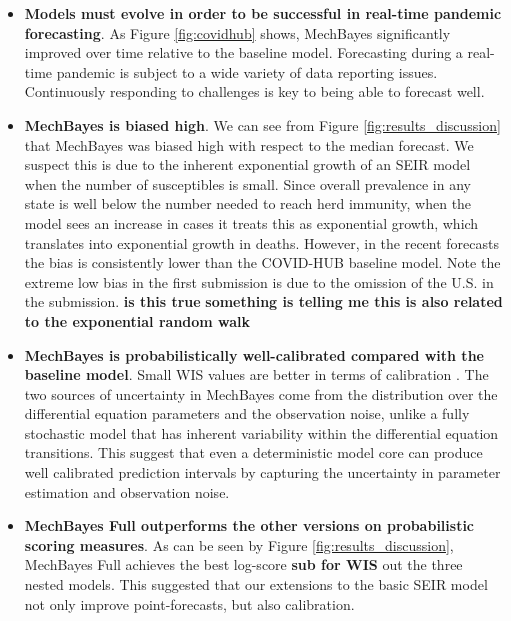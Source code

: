 \documentclass[11pt]{amsart}
\begin{document}
\begin{itemize}
\item \textbf{Models must evolve in order to be successful in real-time pandemic forecasting}. As Figure \ref{fig:covidhub} shows, MechBayes significantly improved over time relative to the baseline model. Forecasting during a real-time pandemic is subject to a wide variety of data reporting issues. Continuously responding to challenges is key to being able to forecast well. 

\item \textbf{MechBayes is biased high}. We can see from Figure \ref{fig:results_discussion} that MechBayes was biased high with respect to the median forecast. We suspect this is due to the inherent exponential growth of an SEIR model when the number of susceptibles is small. Since overall prevalence in any state is well below the number needed to reach herd immunity, when the model sees an increase in cases it treats this as exponential growth, which translates into exponential growth in deaths. However, in the recent forecasts the bias is consistently lower than the COVID-HUB baseline model. Note the extreme low bias in the first submission is due to the omission of the U.S. in the submission. \textbf{is this true} \textbf{something is telling me this is also related to the exponential random walk}

\item \textbf{MechBayes is probabilistically well-calibrated compared with the baseline model}. Small WIS values are better in terms of calibration \cite{bracher2020evaluating}. The two sources of uncertainty in MechBayes come from the distribution over the differential equation parameters and the observation noise, unlike a fully stochastic model that has inherent variability within the differential equation transitions. This suggest that even a deterministic model core can produce well calibrated prediction intervals by capturing the uncertainty in parameter estimation and observation noise.


\item \textbf{MechBayes Full outperforms the other versions on probabilistic scoring measures}. As can be seen by Figure \ref{fig:results_discussion}, MechBayes Full achieves the best log-score \textbf{sub for WIS } out the three nested models. This suggested that our extensions to the basic SEIR model not only improve point-forecasts, but also calibration. 

 

\end{itemize}
\end{document}

